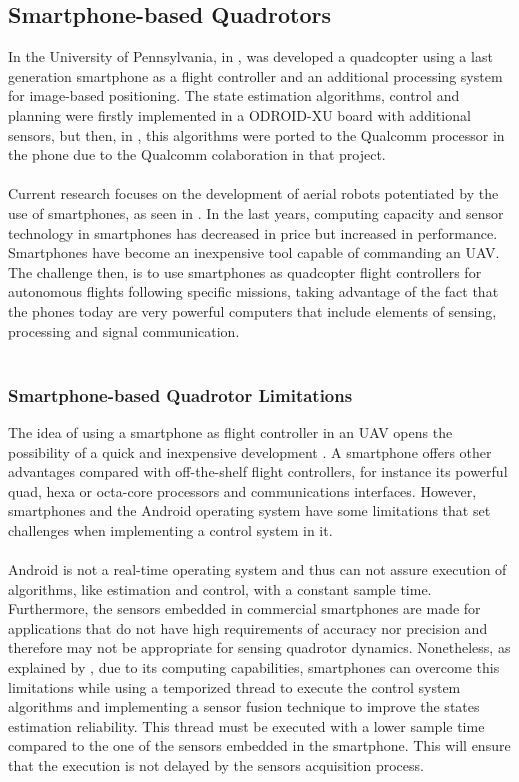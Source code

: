 \subsection{Smartphone-based Quadrotors}
\cite{Alsharif2017a}
\cite{Alsharif2016}
\cite{Alsharif2017}
\cite{Loianno2017}
\cite{Isuru2017}

In the University of Pennsylvania, in \cite{Loianno2015}, was developed a quadcopter using a last generation smartphone as a flight controller and an additional processing system for image-based positioning. The state estimation algorithms, control and planning were firstly implemented in a ODROID-XU board with additional sensors, but then, in \cite{Loianno2015a}, this algorithms were ported to the Qualcomm processor in the phone due to the Qualcomm colaboration in that project.
\\\\
Current research focuses on the development of aerial robots potentiated by the use of smartphones, as seen in \cite{Pearce2014a, ALEMARK2014a, Aldrovandi2015, Bryant2015}. In the last years, computing capacity and sensor technology in smartphones has decreased in price but increased in performance. Smartphones have become an inexpensive tool capable of commanding an UAV. The challenge then, is to use smartphones as quadcopter flight controllers for autonomous flights following specific missions, taking advantage of the fact that the phones today are very powerful computers that include elements of sensing, processing and signal communication.
\\\\

\subsubsection{Smartphone-based Quadrotor Limitations}
The idea of using a smartphone as flight controller in an UAV opens the possibility of a quick and inexpensive development \cite{Aldrovandi2015}. A smartphone offers other advantages compared with off-the-shelf flight controllers, for instance its powerful quad, hexa or octa-core processors and communications interfaces. However, smartphones and the Android operating system have some limitations that set challenges when implementing a control system in it.\\\\
Android is not a real-time operating system and thus can not assure execution of algorithms, like estimation and control, with a constant sample time. Furthermore, the sensors embedded in commercial smartphones are made for applications that do not have high requirements of accuracy nor precision and therefore may not be appropriate for sensing quadrotor dynamics. Nonetheless, as explained by \cite{Bryant2015}, due to its computing capabilities, smartphones can overcome this limitations while using a temporized thread to execute the control system algorithms and implementing a sensor fusion technique to improve the states estimation reliability. This thread must be executed with a lower sample time compared to the one of the sensors embedded in the smartphone. This will ensure that the execution is not delayed by the sensors acquisition process.

